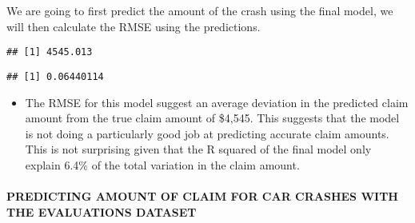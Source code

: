 \documentclass[
]{article}
\newenvironment{Shaded}{\begin{snugshade}}{\end{snugshade}}
\newcommand{\AttributeTok}[1]{\textcolor[rgb]{0.77,0.63,0.00}{#1}}
\newcommand{\DecValTok}[1]{\textcolor[rgb]{0.00,0.00,0.81}{#1}}
\newcommand{\FunctionTok}[1]{\textcolor[rgb]{0.00,0.00,0.00}{#1}}
\newcommand{\NormalTok}[1]{#1}
\newcommand{\OtherTok}[1]{\textcolor[rgb]{0.56,0.35,0.01}{#1}}
\newcommand{\SpecialCharTok}[1]{\textcolor[rgb]{0.00,0.00,0.00}{#1}}
\newcommand{\StringTok}[1]{\textcolor[rgb]{0.31,0.60,0.02}{#1}}
\providecommand{\tightlist}{%
  \setlength{\itemsep}{0pt}\setlength{\parskip}{0pt}}
\begin{document}
We are going to first predict the amount of the crash using the final
model, we will then calculate the RMSE using the predictions.

\begin{Shaded}
\end{Shaded}

\begin{verbatim}
## [1] 4545.013
\end{verbatim}

\begin{Shaded}
\end{Shaded}

\begin{verbatim}
## [1] 0.06440114
\end{verbatim}

\begin{itemize}
\tightlist
\item
  The RMSE for this model suggest an average deviation in the predicted
  claim amount from the true claim amount of \$4,545. This suggests that
  the model is not doing a particularly good job at predicting accurate
  claim amounts. This is not surprising given that the R squared of the
  final model only explain 6.4\% of the total variation in the claim
  amount.
\end{itemize}

\hypertarget{predicting-amount-of-claim-for-car-crashes-with-the-evaluations-dataset}{%
\paragraph{PREDICTING AMOUNT OF CLAIM FOR CAR CRASHES WITH THE
EVALUATIONS
DATASET}\label{predicting-amount-of-claim-for-car-crashes-with-the-evaluations-dataset}}
\end{document}
